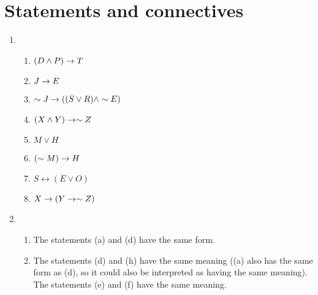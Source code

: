 \section{Statements and connectives}

\solutions{}

\begin{enumerate}
  \item %
    \begin{enumerate}[(\alph*), align=left]
      \item \((D \wedge P) \rightarrow T\)
      \item \(J \rightarrow E\)
      \item \(\sim J \rightarrow ((S \vee R) \wedge \sim E)\)
      \item \((X \wedge Y) \rightarrow \sim Z\)
      \item \(M \vee H\)
      \item \((\sim M) \rightarrow H\)
      \item \(S \leftrightarrow (E \vee O)\)
      \item \(X \rightarrow (Y \rightarrow \sim Z)\)
    \end{enumerate}

  \item %
    \begin{enumerate}[(\alph*), align=left]
      \item The statements (a) and (d) have the same form.
      \item The statements (d) and (h) have the same meaning ((a) also has the same form as (d), so it could also be interpreted as having the same meaning). The statements (e) and (f) have the same meaning.
    \end{enumerate}
\end{enumerate}
